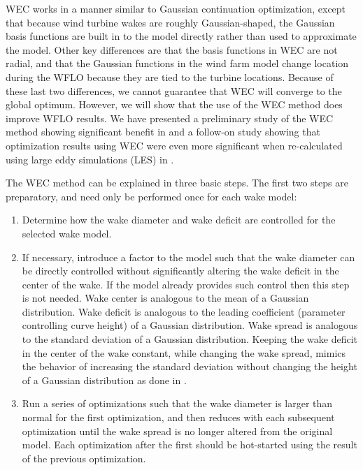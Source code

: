 \documentclass[journal abbreviation, manuscript]{copernicus}
\begin{document}
	WEC works in a manner similar to Gaussian continuation optimization, except that because wind turbine wakes are roughly Gaussian-shaped, the Gaussian basis functions are built in to the model directly rather than used to approximate the model. Other key differences are that the basis functions in WEC are not radial, and that the Gaussian functions in the wind farm model change location during the WFLO because they are tied to the turbine locations. Because of these last two differences, we cannot guarantee that WEC will converge to the global optimum. However, we will show that the use of the WEC method does improve WFLO results. We have presented a preliminary study of the WEC method showing significant benefit in \cite{thomas2018-wec} and a follow-on study showing that optimization results using WEC were even more significant when re-calculated using large eddy simulations (LES) in \cite{thomas2019-les-validation}.
	
	The WEC method can be explained in three basic steps. The first two steps are preparatory, and need only be performed once for each wake model:
	\begin{enumerate}[label=\arabic*)]
		\item Determine how the wake diameter and wake deficit are controlled for the selected wake model.
		\item If necessary, introduce a factor to the model such that the wake diameter can be directly controlled without significantly altering the wake deficit in the center of the wake. If the model already provides such control then this step is not needed. Wake center is analogous to the mean of a Gaussian distribution. Wake deficit is analogous to the leading coefficient (parameter controlling curve height) of a Gaussian distribution. Wake spread is analogous to the standard deviation of a Gaussian distribution.  Keeping the wake deficit in the center of the wake constant, while changing the wake spread, mimics the behavior of increasing the standard deviation without changing the height of a Gaussian distribution as done in \cite{mobahi2015}. 
		\item Run a series of optimizations such that the wake diameter is larger than normal for the first optimization, and then reduces with each subsequent optimization until the wake spread is no longer altered from the original model. Each optimization after the first should be hot-started using the result of the previous optimization.
	\end{enumerate}
	
\end{document}
